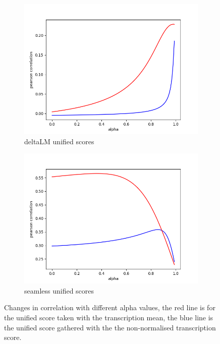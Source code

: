 \begin{figure}[h]
    \centering
    \begin{subfigure}{0.4\linewidth}
        \includegraphics[width=\linewidth]{Latex/sections/images/dlmuniscoredistribution.png}
        \caption{deltaLM unified scores}
    \end{subfigure}
    \begin{subfigure}{0.4\linewidth}
        \includegraphics[width=\linewidth]{Latex/sections/images/seamlessuniscoredistribution.png}
        \caption{seamless unified scores}
    \end{subfigure}
    \caption{Changes in correlation with different alpha values, the red line is for the unified score taken with the transcription mean, the blue line is the unified score gathered with the the non-normalised transcription score. }
    \label{fig:uniscore correlation}
\end{figure}

